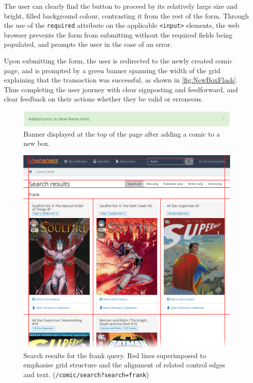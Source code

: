 \documentclass[fontsize=12pt,a4paper]{scrreprt}
\begin{document}
The user can clearly find the button to proceed by its relatively large size and bright, filled background colour, contrasting it from the rest of the form. Through the use of the \texttt{required} attribute on the applicable \texttt{<input>} elements, the web browser prevents the form from submitting without the required fields being populated, and prompts the user in the case of an error.

Upon submitting the form, the user is redirected to the newly created comic page, and is prompted by a green banner spanning the width of the grid explaining that the transaction was successful, as shown in \autoref{fig:NewBoxFlash}. Thus completing the user journey with clear signposting and feedforward, and clear feedback on their actions whether they be valid or erroneous.

\begin{figure}[b]
  \centering
  \includegraphics[width=\textwidth]{new_box_flash.png}
  \caption{
    Banner displayed at the top of the page after adding a comic to a new box.
  }
  \label{fig:NewBoxFlash}
\end{figure}


\newpage

\begin{figure}[p]
  \centering
  \includegraphics[width=\textwidth]{search_results.png}
  \caption{
    Search results for the \textsf{frank} query. Red lines superimposed to emphasise grid structure and the alignment of related control edges and text.
    (\texttt{/comic/search?search=frank})
  }
  \label{fig:SearchResultGrid}
\end{figure}
\end{document}
